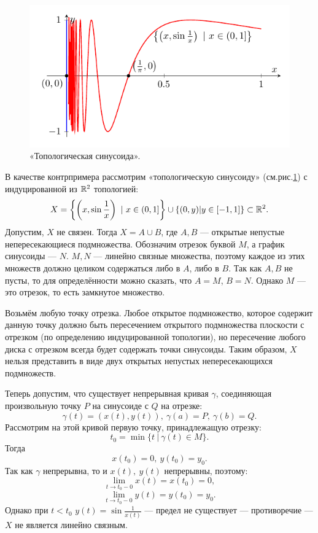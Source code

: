 \begin{example}
    \begin{figure}[h]
        \centering
        \includegraphics[scale=1]{images/c2.2.pdf}
        \caption{«Топологическая синусоида».}
        \label{fig:c2.2}
    \end{figure}
    В качестве контрпримера рассмотрим «топологическую синусоиду» (см.рис.\ref{fig:c2.2}) с индуцированной из $\mathbb{R}^2$ топологией:
    \[X = \left\{\left(x, \sin{\frac{1}{x}}\right) \ |\ x \in (0,1]\right\} \cup \left\{(0,y) | y \in [-1,1]\right\} \subset \R^2.\]
    Допустим, $X$ не связен. Тогда $X = A \cup B$, где $A,B$ — открытые непустые непересекающиеся подмножества. Обозначим отрезок буквой $M$, а график синусоиды — $N$. $M, N$ — линейно связные множества, поэтому каждое из этих множеств должно целиком содержаться либо в $A$, либо в $B$. Так как $A,B$ не пусты, то для определённости можно сказать, что $A = M$, $B = N$. Однако $M$ — это отрезок, то есть замкнутое множество.
    
    Возьмём любую точку отрезка. Любое открытое подмножество, которое содержит данную точку должно быть пересечением открытого подмножества плоскости с отрезком (по определению индуцированной топологии), но пересечение любого диска с отрезком всегда будет содержать точки синусоиды. Таким образом, $X$ нельзя представить в виде двух открытых непустых непересекающихся подмножеств.

    Теперь допустим, что существует непрерывная кривая $\gamma$, соединяющая произвольную точку $P$ на синусоиде с $Q$ на отрезке:
    \[\gamma(t) = (x(t),y(t)), \ \gamma(a) = P, \ \gamma(b) = Q.\]
    Рассмотрим на этой кривой первую точку, принадлежащую отрезку:
    \[t_0 = \min\{t \ |\ \gamma(t) \in M\}.\]
    Тогда \[x(t_0) = 0, \ y(t_0) = y_0.\]
    Так как $\gamma$ непрерывна, то и $x(t), \ y(t)$ непрерывны, поэтому:
    \[\lim\limits_{t \to t_0 - 0}x(t) = x(t_0) = 0,\]
    \[\lim\limits_{t \to t_0 - 0}y(t) = y(t_0) = y_0.\]
    Однако при $t < t_0$ $y(t) = \sin{\frac{1}{x(t)}}$ — предел не существует — противоречие — $X$ не является линейно связным.
\end{example}



